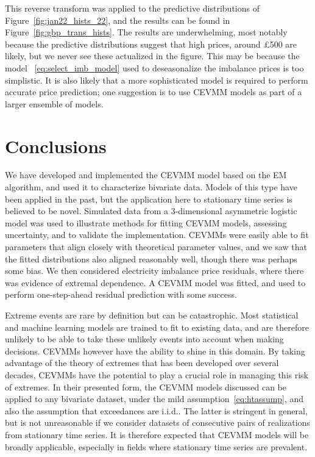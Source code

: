 \documentclass[11pt,twoside,openany]{book}
\numberwithin{Theorem}{chapter}
\numberwithin{Definition}{chapter}
\numberwithin{Lemma}{chapter}
\numberwithin{Algorithm}{chapter}
\numberwithin{equation}{chapter}
\begin{document}
This reverse transform was applied to the predictive distributions of
Figure~\ref{fig:jan22_hists_22}, and the results can be found in
Figure~\ref{fig:gbp_trans_hists}. The results are underwhelming, most notably because the
predictive distributions suggest that high prices, around £500 are likely, but we
never see these actualized in the figure. This may be because the model
~\eqref{eq:select_imb_model} used to deseasonalize the imbalance prices is too
simplistic. It is also likely that a more sophisticated model is required to
perform accurate price prediction; one suggestion is to use CEVMM models
as part of a larger ensemble of models.

\FloatBarrier
\chapter{Conclusions}\label{sec:conclusion}

We have developed and implemented the CEVMM model based on the EM algorithm,
and used it to characterize bivariate data. Models of this type have been
applied in the past, but the application here to stationary time series is
believed to be novel. Simulated data from a 3-dimensional asymmetric logistic
model was used to illustrate methods for fitting CEVMM models, assessing
uncertainty, and to validate the implementation. CEVMMs were
easily able to fit parameters that align closely with theoretical parameter values,
and we saw that the fitted distributions also aligned reasonably well, though
there was perhaps some bias.
We then considered electricity
imbalance price residuals, where there was evidence of extremal dependence. A
CEVMM model was fitted, and used to perform one-step-ahead residual prediction
with some success.

Extreme events are rare by definition but can be catastrophic. Most statistical
and machine learning models are trained to fit to existing data, and are
therefore unlikely to be able to take these unlikely events into account
when making decisions.
CEVMMs however have the ability to shine in this domain.
By taking advantage of the theory of extremes that has been
developed over several decades, CEVMMs have the potential
to play a crucial role in managing this risk of extremes.
In their presented form, the CEVMM models discussed can be applied to any
bivariate dataset, under the mild assumption~\eqref{eq:htassump},
and also the assumption that exceedances are i.i.d.. The latter
is stringent in general, but is not unreasonable if we consider
datasets of consecutive pairs of realizations from stationary time series. It is
therefore expected
that CEVMM models will be broadly applicable, especially in fields
where stationary time series are prevalent.
\end{document}
